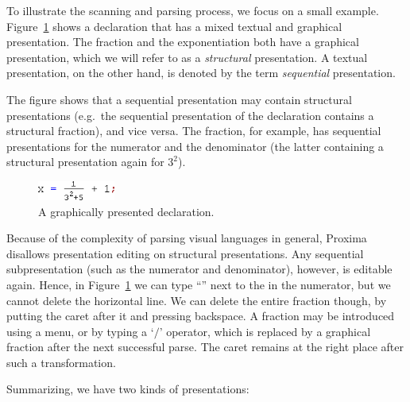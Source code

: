 \documentclass{article}[10pt]
\begin{document}

To illustrate the scanning and parsing process, we focus on a small example. Figure~\ref{fig:graphicalDecl} shows a declaration that has a mixed textual and graphical presentation. The fraction and the exponentiation both have a graphical presentation, which we will refer to as a {\em structural} presentation. A textual presentation, on the other hand, is denoted by the term {\em sequential} presentation. 

\enlargethispage{\baselineskip}
The figure shows that a sequential presentation may contain structural presentations (e.g.\ the sequential presentation of the declaration contains a structural fraction), and vice versa. The fraction, for example, has sequential presentations for the numerator and the denominator (the latter containing a structural presentation again for $3^2$).


\begin{figure}
\begin{center}
\includegraphics[width=1in]{images/scanFrac}
\end{center}
\caption{A graphically presented declaration.} \label{fig:graphicalDecl} 
\end{figure}




Because of the complexity of parsing visual languages in general, Proxima disallows presentation editing on structural presentations. Any sequential subpresentation (such as the numerator and denominator), however, is editable again. Hence, in Figure~\ref{fig:graphicalDecl} we can type ``'' next to the  in the numerator, but we cannot delete the horizontal line. We can delete the entire fraction though, by putting the caret after it and pressing backspace. A fraction may be introduced using a menu, or by typing a `$/$' operator, which is replaced by a graphical fraction after the next successful parse. The caret remains at the right place after such a transformation.

Summarizing, we have two kinds of presentations:
\end{document}
